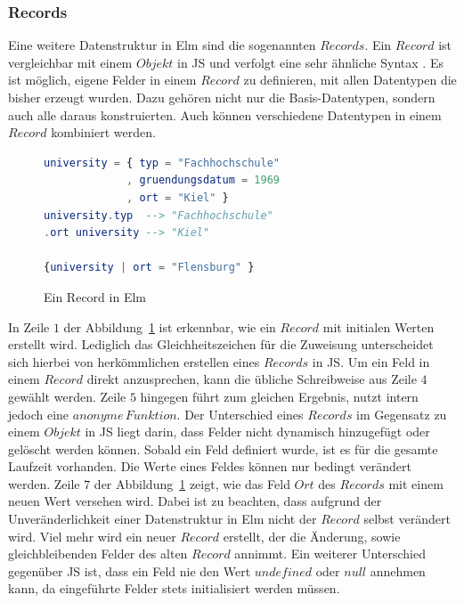 \subsubsection{Records}
\label{sec:Records}
Eine weitere Datenstruktur in Elm sind die sogenannten $Records$. Ein $Record$ ist vergleichbar mit einem $Objekt$ in \ac{JS} und verfolgt eine sehr ähnliche Syntax \cite[Vgl.]{elm-docs}. Es ist möglich, eigene Felder in einem $Record$ zu definieren, mit allen Datentypen die bisher erzeugt wurden. Dazu gehören nicht nur die Basis-Datentypen, sondern auch alle daraus konstruierten. Auch können verschiedene Datentypen in einem $Record$ kombiniert werden.
\begin{figure}[h]
\begin{lstlisting}[language=Elm]
university = { typ = "Fachhochschule"
             , gruendungsdatum = 1969
             , ort = "Kiel" }
university.typ  --> "Fachhochschule"
.ort university --> "Kiel"

{university | ort = "Flensburg" }
\end{lstlisting}
\caption{Ein Record in Elm}\label{fig:elm-record}
\end{figure}
In Zeile $1$ der Abbildung~\ref{fig:elm-record} ist erkennbar, wie ein $Record$ mit initialen Werten erstellt wird. Lediglich das Gleichheitszeichen für die Zuweisung unterscheidet sich hierbei von herkömmlichen erstellen eines $Records$ in \ac{JS}. Um ein Feld in einem $Record$ direkt anzusprechen, kann die übliche Schreibweise aus Zeile $4$ gewählt werden. Zeile $5$ hingegen führt zum gleichen Ergebnis, nutzt intern jedoch eine $anonyme\,Funktion$. Der Unterschied eines $Records$ im Gegensatz zu einem $Objekt$ in \ac{JS} liegt darin, dass Felder nicht dynamisch hinzugefügt oder gelöscht werden können. Sobald ein Feld definiert wurde, ist es für die gesamte Laufzeit vorhanden. Die Werte eines Feldes können nur bedingt verändert werden. Zeile $7$ der Abbildung~\ref{fig:elm-record} zeigt, wie das Feld $Ort$ des $Records$ mit einem neuen Wert versehen wird. Dabei ist zu beachten, dass aufgrund der Unveränderlichkeit einer Datenstruktur in Elm nicht der $Record$ selbst verändert wird. Viel mehr wird ein neuer $Record$ erstellt, der die Änderung, sowie gleichbleibenden Felder des alten $Record$ annimmt. Ein weiterer Unterschied gegenüber \ac{JS} ist, dass ein Feld nie den Wert $undefined$ oder $null$ annehmen kann, da eingeführte Felder stets initialisiert werden müssen.


